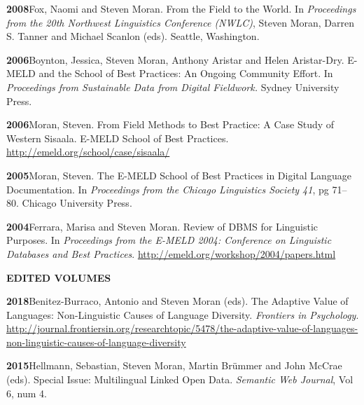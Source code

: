 \documentclass[11pt]{article}
\newcommand{\hangpara}{
 \setlength{\parindent}{0in} %
 \hangindent=0.42in %
}
\begin{document}
\vskip 6pt
\hangpara
{\bf 2008}\hspace{1ex}Fox, Naomi and Steven Moran. From the Field to the World. In {\it Proceedings from the 20th Northwest Linguistics Conference (NWLC)}, Steven Moran, Darren S. Tanner and Michael Scanlon (eds). Seattle, Washington. %

\vskip 6pt
\hangpara
{\bf 2006}\hspace{1ex}Boynton, Jessica, Steven Moran, Anthony Aristar and Helen Aristar-Dry. E-MELD and the School of Best Practices: An Ongoing Community Effort. In {\it Proceedings from Sustainable Data from Digital Fieldwork.} Sydney University Press. %

\vskip 6pt
\hangpara
{\bf 2006}\hspace{1ex}Moran, Steven. From Field Methods to Best Practice: A Case Study of Western Sisaala. E-MELD School of Best Practices. \url{http://emeld.org/school/case/sisaala/}

\vskip 6pt
\hangpara
{\bf 2005}\hspace{1ex}Moran, Steven. The E-MELD School of Best Practices in Digital Language Documentation. In {\it Proceedings from the Chicago Linguistics Society 41}, pg 71--80. Chicago University Press. 


\vskip 6pt
\hangpara
{\bf 2004}\hspace{1ex}Ferrara, Marisa and Steven Moran. Review of DBMS for Linguistic Purposes. In {\it Proceedings from the E-MELD 2004: Conference on Linguistic Databases and Best Practices}. \url{http://emeld.org/workshop/2004/papers.html}

\vskip 20pt
\begin{flushleft}
{\bf EDITED VOLUMES}
\end{flushleft}

\hangpara
{\bf 2018}\hspace{1ex}Benitez-Burraco, Antonio and Steven Moran (eds). The Adaptive Value of Languages: Non-Linguistic Causes of Language Diversity. {\it Frontiers in Psychology}. \url{http://journal.frontiersin.org/researchtopic/5478/the-adaptive-value-of-languages-non-linguistic-causes-of-language-diversity}

\hangpara
\vskip 6pt
{\bf 2015}\hspace{1ex}Hellmann, Sebastian, Steven Moran, Martin Br{\"u}mmer and John McCrae (eds). Special Issue: Multilingual Linked Open Data. {\it Semantic Web Journal}, Vol 6, num 4.
\end{document}
